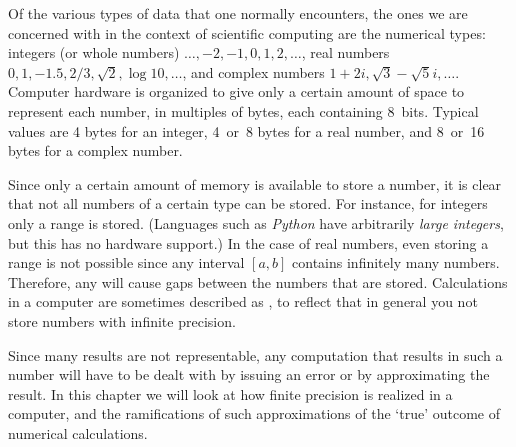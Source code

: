 

Of the various types of data that one normally encounters, the ones we
are concerned with in the context of scientific computing are the
numerical types: integers (or whole numbers)
$\ldots,-2,-1,0,1,2,\ldots$, real numbers $0,1,-1.5,2/3,\sqrt 2,\log
10,\ldots$, and complex numbers $1+2i,\sqrt 3-\sqrt 5i,\ldots$.
Computer hardware is organized to give only a certain amount of space to
represent each number, in multiples of bytes, each
containing 8~bits. Typical values are 4 bytes for an
integer,  4~or~8 bytes for a real number, and 8~or~16 bytes for a
complex number.

Since only a certain amount of memory is available to store a number,
it is clear that not all numbers of a certain type can be stored. For
instance, for integers only a range is stored.
%
(Languages such as
\emph{Python}
have arbitrarily \emph{large integers}, but this has no hardware support.)
%
In the case of real
numbers, even storing a range is not possible since any interval $[a,b]$
contains infinitely many numbers. Therefore, any
 will cause gaps between the
numbers that are stored. 
Calculations in a computer are sometimes
described as ,
to reflect that in general you not store numbers with infinite
precision.

Since many results are not representable, any computation that results in
such a number will have to be dealt with by issuing an
error or by approximating the result. 
In this chapter we will look at
how finite precision is realized in a computer,
and
the ramifications of such approximations of the `true' outcome of
numerical calculations. 

